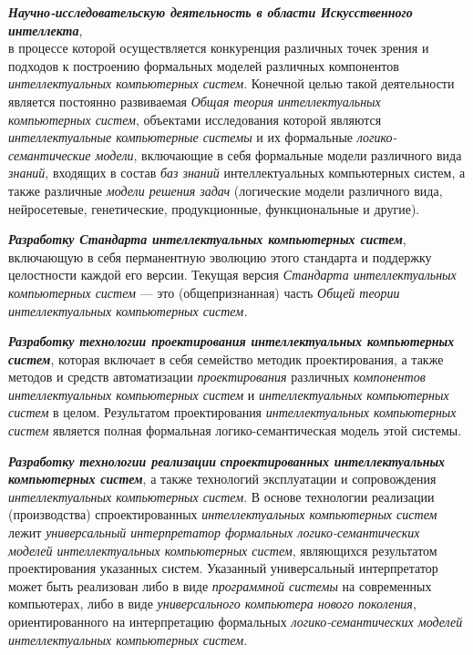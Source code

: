 \begin{textitemize}
	\item
	\textbf{\textit{Научно-исследовательскую деятельность в области Искусственного интеллекта}},\\
	в процессе которой осуществляется конкуренция различных точек зрения и подходов к построению формальных моделей различных компонентов \textit{интеллектуальных компьютерных систем}. Конечной целью такой деятельности является постоянно развиваемая \textit{Общая теория} \textit{интеллектуальных} \textit{компьютерных систем}, объектами исследования которой являются \textit{интеллектуальные компьютерные системы} и их формальные \textit{логико-семантические модели}, включающие в себя формальные модели различного вида \textit{знаний}, входящих в состав \textit{баз знаний} интеллектуальных компьютерных систем, а также различные \textit{модели решения задач} (логические модели различного вида, нейросетевые, генетические, продукционные, функциональные и другие).
	\item
	\textbf{\textit{Разработку Стандарта интеллектуальных компьютерных систем}}, включающую в себя перманентную эволюцию этого стандарта и поддержку целостности каждой его версии. Текущая версия \textit{Стандарта интеллектуальных компьютерных систем} --- это  (общепризнанная)  часть \textit{Общей теории интеллектуальных компьютерных систем.}
	\item
	\textbf{\textit{Разработку технологии проектирования интеллектуальных компьютерных систем}}, которая включает в себя семейство методик проектирования, а также методов и средств автоматизации \textit{проектирования} различных \textit{компонентов} \textit{интеллектуальных компьютерных систем} и \textit{интеллектуальных компьютерных систем} в целом. Результатом проектирования \textit{интеллектуальных компьютерных систем} является полная формальная логико-семантическая модель этой системы.
	\item
	\textbf{\textit{Разработку технологии реализации}} \textbf{\textit{спроектированных интеллектуальных компьютерных систем}}, а также технологий эксплуатации и сопровождения \textit{интеллектуальных компьютерных систем}. В основе технологии реализации (производства) спроектированных \textit{интеллектуальных компьютерных систем} лежит \textit{универсальный интерпретатор формальных логико-семантических моделей интеллектуальных компьютерных систем}, являющихся результатом проектирования указанных систем. Указанный универсальный интерпретатор может быть реализован либо в виде \textit{программной системы} на современных компьютерах, либо в виде \textit{универсального компьютера нового поколения}, ориентированного на интерпретацию формальных \textit{логико-семантических моделей интеллектуальных компьютерных систем}.

\end{textitemize}
